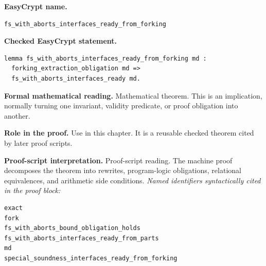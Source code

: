 \begin{formaltheorem}
\noindent\textbf{EasyCrypt name.}
\begin{lstlisting}[language=EasyCrypt,basicstyle=\ttfamily\scriptsize]
fs_with_aborts_interfaces_ready_from_forking
\end{lstlisting}
\noindent\textbf{Checked EasyCrypt statement.}
\begin{lstlisting}[language=EasyCrypt,basicstyle=\ttfamily\scriptsize]
lemma fs_with_aborts_interfaces_ready_from_forking md :
  forking_extraction_obligation md =>
  fs_with_aborts_interfaces_ready md.
\end{lstlisting}
\noindent\textbf{Formal mathematical reading.}
Mathematical theorem. This is an implication, normally turning one invariant, validity predicate, or proof obligation into another.

\noindent\textbf{Role in the proof.}
Use in this chapter. It is a reusable checked theorem cited by later proof scripts.

\noindent\textbf{Proof-script interpretation.}
Proof-script reading. The machine proof decomposes the theorem into rewrites, program-logic obligations, relational equivalences, and arithmetic side conditions.
\emph{Named identifiers syntactically cited in the proof block:}
\begin{lstlisting}[language=EasyCrypt,basicstyle=\ttfamily\scriptsize]
exact
fork
fs_with_aborts_bound_obligation_holds
fs_with_aborts_interfaces_ready_from_parts
md
special_soundness_interfaces_ready_from_forking
\end{lstlisting}

\end{formaltheorem}

